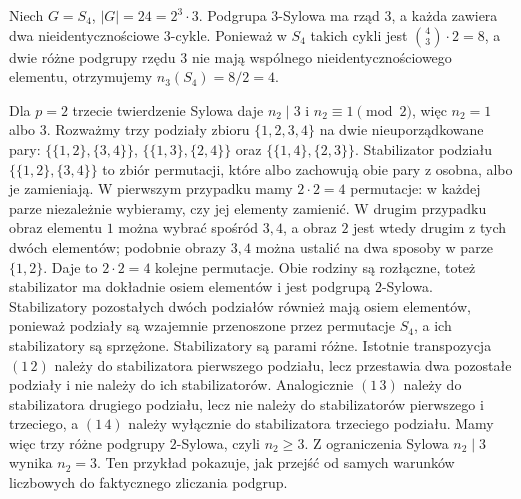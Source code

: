 \begin{przyklad}
Niech $G=S_4$, $|G|=24=2^3\cdot3$.
Podgrupa $3$-Sylowa ma rząd $3$, a każda zawiera dwa
nieidentycznościowe $3$-cykle. Ponieważ w $S_4$ takich
cykli jest $\binom43\cdot2=8$, a dwie różne podgrupy
rzędu $3$ nie mają wspólnego nieidentycznościowego elementu,
otrzymujemy $n_3(S_4)=8/2=4$.

Dla $p=2$ trzecie twierdzenie Sylowa daje
$n_2\mid3$ i $n_2\equiv1\pmod2$, więc $n_2=1$ albo $3$.
Rozważmy trzy podziały zbioru $\{1,2,3,4\}$ na dwie
nieuporządkowane pary:
$\{\{1,2\},\{3,4\}\}$,
$\{\{1,3\},\{2,4\}\}$ oraz
$\{\{1,4\},\{2,3\}\}$.
Stabilizator podziału $\{\{1,2\},\{3,4\}\}$ to zbiór
permutacji, które albo zachowują obie pary z osobna,
albo je zamieniają. W pierwszym przypadku mamy $2\cdot2=4$
permutacje: w każdej parze niezależnie wybieramy, czy jej
elementy zamienić. W drugim przypadku obraz elementu $1$
można wybrać spośród $3,4$, a obraz $2$ jest wtedy
drugim z tych dwóch elementów; podobnie obrazy $3,4$
można ustalić na dwa sposoby w parze $\{1,2\}$.
Daje to $2\cdot2=4$ kolejne permutacje.
Obie rodziny są rozłączne, toteż stabilizator ma dokładnie
osiem elementów i jest podgrupą $2$-Sylowa.
Stabilizatory pozostałych dwóch podziałów również mają
osiem elementów, ponieważ podziały są wzajemnie
przenoszone przez permutacje $S_4$, a ich stabilizatory
są sprzężone.
Stabilizatory są parami różne. Istotnie transpozycja
$(1\,2)$ należy do stabilizatora pierwszego podziału,
lecz przestawia dwa pozostałe podziały i nie należy do ich
stabilizatorów. Analogicznie $(1\,3)$ należy do stabilizatora
drugiego podziału, lecz nie należy do stabilizatorów pierwszego
i trzeciego, a $(1\,4)$ należy wyłącznie do stabilizatora
trzeciego podziału. Mamy więc trzy różne podgrupy
$2$-Sylowa, czyli $n_2\ge3$.
Z ograniczenia Sylowa $n_2\mid3$ wynika $n_2=3$.
Ten przykład pokazuje, jak przejść od samych warunków
liczbowych do faktycznego zliczania podgrup.
\end{przyklad}

